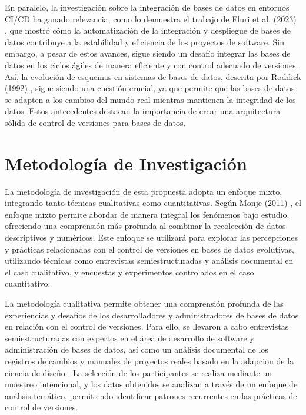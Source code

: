 \documentclass{IEEEtran}
\begin{document}
En paralelo, la investigación sobre la integración de bases de datos en entornos CI/CD ha ganado relevancia, como lo demuestra el trabajo de Fluri et al. (2023) \cite{fluri2023measuring}, que mostró cómo la automatización de la integración y despliegue de bases de datos contribuye a la estabilidad y eficiencia de los proyectos de software. Sin embargo, a pesar de estos avances, sigue siendo un desafío integrar las bases de datos en los ciclos ágiles de manera eficiente y con control adecuado de versiones. Así, la evolución de esquemas en sistemas de bases de datos, descrita por Roddick (1992) \cite{roddick1992schema}, sigue siendo una cuestión crucial, ya que permite que las bases de datos se adapten a los cambios del mundo real mientras mantienen la integridad de los datos. Estos antecedentes destacan la importancia de crear una arquitectura sólida de control de versiones para bases de datos.

\section{Metodología de Investigación}
La metodología de investigación de esta propuesta adopta un enfoque mixto, integrando tanto técnicas cualitativas como cuantitativas. Según Monje (2011) \cite{Monje2011}, el enfoque mixto permite abordar de manera integral los fenómenos bajo estudio, ofreciendo una comprensión más profunda al combinar la recolección de datos descriptivos y numéricos. Este enfoque se utilizará para explorar las percepciones y prácticas relacionadas con el control de versiones en bases de datos evolutivas, utilizando técnicas como entrevistas semiestructuradas y análisis documental en el caso cualitativo, y encuestas y experimentos controlados en el caso cuantitativo.

La metodología cualitativa permite obtener una comprensión profunda de las experiencias y desafíos de los desarrolladores y administradores de bases de datos en relación con el control de versiones. Para ello, se llevaron a cabo entrevistas semiestructuradas con expertos en el área de desarrollo de software y administración de bases de datos, así como un análisis documental de los registros de cambios y manuales de proyectos reales basado en la adapcion de la ciencia de diseño \cite{RoblesVasquezNaranjo}. La selección de los participantes se realiza mediante un muestreo intencional, y los datos obtenidos se analizan a través de un enfoque de análisis temático, permitiendo identificar patrones recurrentes en las prácticas de control de versiones.
\end{document}
